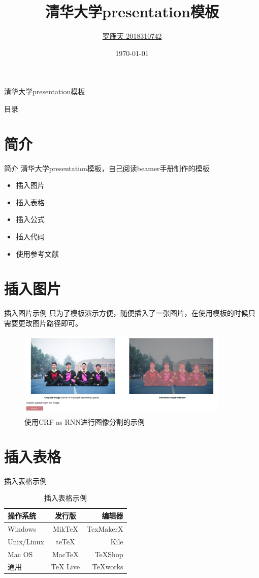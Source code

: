 \documentclass[10pt]{beamer}
\title{清华大学presentation模板}
\author{\href{mailto:luoyt14thu@gmail.com}{罗雁天 2018310742}}
\date{\today}
\newcommand{\upcite}[1]{\textsuperscript{\textsuperscript{\cite{#1}}}}
\begin{document}
\begin{frame}{清华大学presentation模板}
\titlepage
\end{frame}

\begin{frame}{目录}
\tableofcontents
\end{frame}

\section{简介}

\begin{frame}{简介}
清华大学presentation模板，自己阅读beamer手册制作的模板

\begin{itemize}
	\item 插入图片
	\item 插入表格
	\item 插入公式
	\item 插入代码
	\item 使用参考文献
\end{itemize}
\end{frame}

\section{插入图片}
\begin{frame}{插入图片示例}
只为了模板演示方便，随便插入了一张图片，在使用模板的时候只需要更改图片路径即可。
\begin{figure}[h]
	\centering
	\includegraphics[width=0.9\textwidth]{images/segdemo.png}
	\caption{\label{demo}使用CRF as RNN\upcite{zheng2015conditional}进行图像分割的示例}
\end{figure}
\end{frame}

\section{插入表格}
\begin{frame}{插入表格示例}
\begin{table}
	\centering
	\caption{\label{tab1}插入表格示例}
	\begin{tabular}{|l|c|r|}
	\hline
	操作系统& 发行版& 编辑器\\
	\hline
	Windows & MikTeX & TexMakerX \\
	\hline
	Unix/Linux & teTeX & Kile \\
	\hline
	Mac OS & MacTeX & TeXShop \\
	\hline
	通用& TeX Live & TeXworks \\
	\hline
	\end{tabular}
\end{table}
\end{frame}
\end{document}
